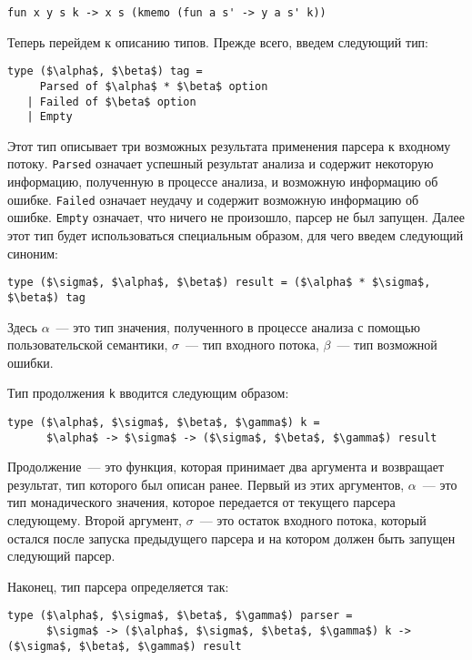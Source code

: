 \documentclass[conference]{IEEEtran}
\begin{document}
\begin{lstlisting}[basicstyle=\small]
   fun x y s k -> x s (kmemo (fun a s' -> y a s' k))
\end{lstlisting}

Теперь перейдем к описанию типов. Прежде всего, введем следующий тип:

\begin{lstlisting}[basicstyle=\small]
   type ($\alpha$, $\beta$) tag =
     Parsed of $\alpha$ * $\beta$ option
   | Failed of $\beta$ option
   | Empty
\end{lstlisting}

Этот тип описывает три возможных результата применения парсера к входному потоку. \lstinline|Parsed| означает успешный результат анализа и содержит некоторую информацию, полученную в процессе
анализа, и возможную информацию об ошибке. \lstinline|Failed| означает неудачу и содержит возможную информацию об ошибке. \lstinline|Empty| означает, что ничего не произошло, парсер не был запущен.
Далее этот тип будет использоваться специальным образом, для чего введем следующий синоним:

\begin{lstlisting}[basicstyle=\small]
   type ($\sigma$, $\alpha$, $\beta$) result = ($\alpha$ * $\sigma$, $\beta$) tag
\end{lstlisting}

Здесь $\alpha$~--- это тип значения, полученного в процессе анализа с помощью пользовательской семантики, $\sigma$~--- тип входного потока, $\beta$~--- тип возможной ошибки.

Тип продолжения \lstinline|k| вводится следующим образом:

\begin{lstlisting}[basicstyle=\small]
   type ($\alpha$, $\sigma$, $\beta$, $\gamma$) k =
      $\alpha$ -> $\sigma$ -> ($\sigma$, $\beta$, $\gamma$) result
\end{lstlisting}

Продолжение~--- это функция, которая принимает два аргумента и возвращает результат, тип которого был описан ранее. Первый из этих аргументов, $\alpha$~--- это тип монадического значения,
которое передается от текущего парсера следующему. Второй аргумент, $\sigma$~--- это остаток входного потока, который остался после запуска предыдущего парсера и на котором должен быть
запущен следующий парсер.

Наконец, тип парсера определяется так:

\begin{lstlisting}[basicstyle=\small]
   type ($\alpha$, $\sigma$, $\beta$, $\gamma$) parser =
      $\sigma$ -> ($\alpha$, $\sigma$, $\beta$, $\gamma$) k -> ($\sigma$, $\beta$, $\gamma$) result
\end{lstlisting}
\end{document}
